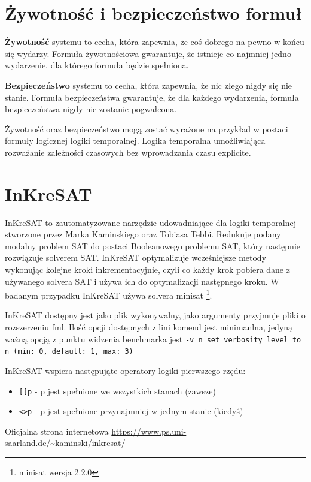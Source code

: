 \documentclass[a4paper,12pt]{article}
\begin{document}
\section{Żywotność i bezpieczeństwo formuł}

\textbf{Żywotność} systemu to cecha, która zapewnia, że coś dobrego na pewno w końcu się wydarzy. Formuła żywotnościowa gwarantuje, że istnieje co najmniej jedno wydarzenie, dla którego formuła będzie spełniona.

\textbf{Bezpieczeństwo} systemu to cecha, która zapewnia, że nic złego nigdy się nie stanie. Formuła bezpieczeństwa gwarantuje, że dla każdego wydarzenia, formuła bezpieczeństwa nigdy nie zostanie pogwałcona.

Żywotność oraz bezpieczeństwo mogą zostać wyrażone na przykład w postaci formuły logicznej logiki temporalnej. Logika temporalna umożliwiająca rozważanie zależności czasowych bez wprowadzania czasu explicite.

\section{InKreSAT}

InKreSAT to zautomatyzowane narzędzie udowadniające dla logiki temporalnej stworzone przez Marka Kaminskiego oraz Tobiasa Tebbi. Redukuje podany modalny problem SAT do postaci Booleanowego problemu SAT, który następnie rozwiązuje solverem SAT. InKreSAT optymalizuje wcześniejsze metody wykonując kolejne kroki inkrementacyjnie, czyli co każdy krok pobiera dane z używanego solvera SAT i używa ich do optymalizacji następnego kroku. W badanym przypadku InKreSAT używa solvera  minisat \footnote{minisat wersja 2.2.0}.

InKreSAT dostępny jest jako plik wykonywalny, jako argumenty przyjmuje pliki o rozszerzeniu fml. Ilość opcji dostępnych z lini komend jest minimanlna, jedyną ważną opcją z punktu widzenia benchmarka jest \texttt{-v n  set verbosity level to n (min: 0, default: 1, max: 3)}

InKreSAT wspiera następująte operatory logiki pierwszego rzędu:
\begin{itemize}
  \item \texttt{[]p} - p jest spełnione we wszystkich stanach (zawsze)
  \item \texttt{<>p} - p jest spełnione przynajmniej w jednym stanie (kiedyś)
\end{itemize}

\noindent
Oficjalna strona internetowa \url{https://www.ps.uni-saarland.de/~kaminski/inkresat/}
\end{document}
